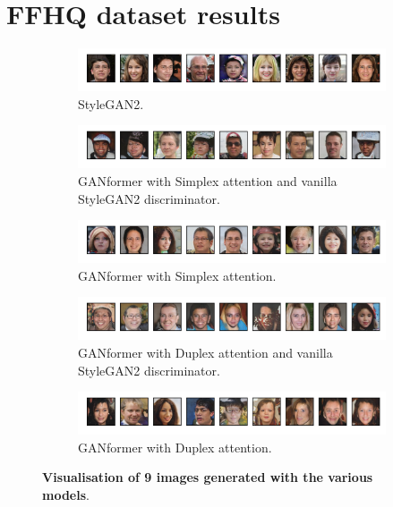 \documentclass{article}
\begin{document}
\section{FFHQ dataset results} \label{sec:ffhq-results}
\begin{figure}[htpb]
	\centering
	\begin{subfigure}{\linewidth}
		\includegraphics[width=\linewidth]{ffhq-random_Stylegan2.png}
		\vspace{-7mm}
		\caption{StyleGAN2.} 
	\end{subfigure}
	\begin{subfigure}{\linewidth}
		\includegraphics[width=\linewidth]{ffhq-random_GANFormerSimplexNoAtt.png}
		\vspace{-7mm}
		\caption{GANformer with Simplex attention and vanilla StyleGAN2 discriminator.}
	\end{subfigure}
	\begin{subfigure}{\linewidth}
		\includegraphics[width=\linewidth]{ffhq-random_GANFormerSimplexAtt.png}
		\vspace{-7mm}
		\caption{GANformer with Simplex attention.}
	\end{subfigure}
	\begin{subfigure}{\linewidth}
		\includegraphics[width=\linewidth]{ffhq-random_GANFormerDuplexNoAtt.png}
		\vspace{-7mm}
		\caption{GANformer with Duplex attention and vanilla StyleGAN2 discriminator.}
	\end{subfigure}
	\begin{subfigure}{\linewidth}
		\includegraphics[width=\linewidth]{ffhq-random_GANFormerDuplexAtt.png}
		\vspace{-7mm}
		\caption{GANformer with Duplex attention.}
	\end{subfigure}
	\vspace{3mm}
	\caption{\textbf{Visualisation of 9 images generated with the various models}.}\label{fig:random-ffhq}
\end{figure}
\end{document}
